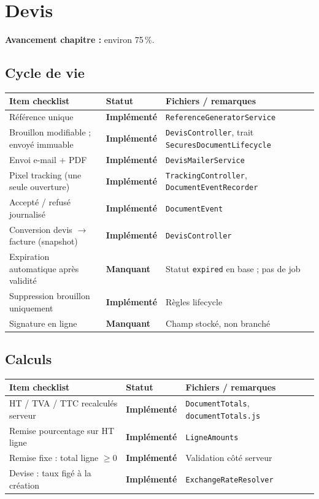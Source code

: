 \documentclass[11pt,a4paper]{report}
\newcommand{\route}[1]{\texttt{\small #1}}
\newcommand{\ctrl}[1]{\texttt{\small #1}}
\newcommand{\svc}[1]{\texttt{\small #1}}
\newcommand{\model}[1]{\texttt{\small #1}}
\newcommand{\statimpl}{\textcolor{statok}{\textbf{Implémenté}}}
\newcommand{\statmiss}{\textcolor{statno}{\textbf{Manquant}}}
\begin{document}
\chapter{Devis}

\textbf{Avancement chapitre :} environ 75\,\%.

\section{Cycle de vie}

\begin{longtable}{@{}L{7.8cm}C{2.4cm}L{4.4cm}@{}}
    \toprule
    \textbf{Item checklist} & \textbf{Statut} & \textbf{Fichiers / remarques} \\
    \midrule
    \endhead
    Référence unique & \statimpl & \svc{ReferenceGeneratorService} \\
    Brouillon modifiable ; envoyé immuable & \statimpl & \ctrl{DevisController}, trait \ctrl{SecuresDocumentLifecycle} \\
    Envoi e-mail + PDF & \statimpl & \svc{DevisMailerService} \\
    Pixel tracking (une seule ouverture) & \statimpl & \ctrl{TrackingController}, \svc{DocumentEventRecorder} \\
    Accepté / refusé journalisé & \statimpl & \model{DocumentEvent} \\
    Conversion devis $\rightarrow$ facture (snapshot) & \statimpl & \ctrl{DevisController} \\
    Expiration automatique après validité & \statmiss & Statut \texttt{expired} en base ; pas de job \\
    Suppression brouillon uniquement & \statimpl & Règles lifecycle \\
    Signature en ligne & \statmiss & Champ stocké, non branché \\
    \bottomrule
\end{longtable}

\section{Calculs}

\begin{longtable}{@{}L{7.8cm}C{2.4cm}L{4.4cm}@{}}
    \toprule
    \textbf{Item checklist} & \textbf{Statut} & \textbf{Fichiers / remarques} \\
    \midrule
    \endhead
    HT / TVA / TTC recalculés serveur & \statimpl & \svc{DocumentTotals}, \route{documentTotals.js} \\
    Remise pourcentage sur HT ligne & \statimpl & \svc{LigneAmounts} \\
    Remise fixe : total ligne $\geq 0$ & \statimpl & Validation côté serveur \\
    Devise : taux figé à la création & \statimpl & \svc{ExchangeRateResolver} \\
    \bottomrule
\end{longtable}
\end{document}
